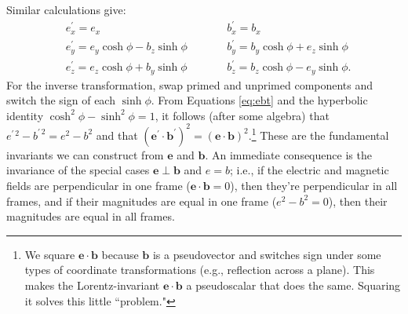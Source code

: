 \documentclass[12pt]{article}
\renewcommand{\vv}[1]{\mathbf{#1}}
\begin{document}
Similar calculations give:
\begin{equation}\label{eq:ebt}
\begin{aligned}
&e^\prime_x = e_x  \qquad \qquad& &b^\prime_x = b_x  \\
&e^\prime_y = e_y \cosh{\phi} - b_z \sinh{\phi}  \qquad& &b^\prime_y = b_y \cosh{\phi} + e_z \sinh{\phi} \\
&e^\prime_z = e_z \cosh{\phi} + b_y \sinh{\phi}  \qquad& &b^\prime_z = b_z \cosh{\phi} - e_y \sinh{\phi} .
\end{aligned}
\end{equation}
For the inverse transformation, swap primed and unprimed components and switch the sign of each $\sinh{\phi}$. From Equations \ref{eq:ebt} and the hyperbolic identity ${\cosh^{2}{\phi} - \sinh^{2}{\phi} = 1}$, it follows (after some algebra) that  $e^{\prime \, 2} - b^{\prime \, 2} = e^2 - b^2$ and that $(\vv e^\prime \cdot \vv b^\prime)^2 = (\vv e \cdot \vv b)^2$.\footnote{We square $\vv e \cdot \vv b$ because $\vv b$ is a pseudovector and switches sign under some types of coordinate transformations (e.g., reflection across a plane). This makes the Lorentz-invariant $\vv e \cdot \vv b$ a pseudoscalar that does the same. Squaring it solves this little ``problem."} These are the fundamental invariants we can construct from $\vv e$ and $\vv b$. An immediate consequence is the invariance of the special cases $\vv e \perp \vv b$ and $e = b$; i.e., if the electric and magnetic fields are perpendicular in one frame ($\vv e \cdot \vv b = 0$), then they're perpendicular in all frames, and if their magnitudes are equal in one frame ($e^2 - b^2 = 0$), then their magnitudes are equal in all frames.
\end{document}
